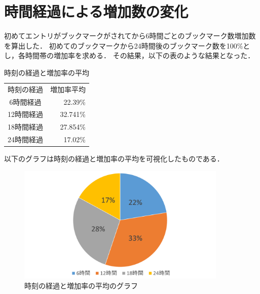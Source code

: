 \newpage
\section{時間経過による増加数の変化}
初めてエントリがブックマークがされてから6時間ごとのブックマーク数増加数を算出した．
初めてのブックマークから24時間後のブックマーク数を100\%とし，各時間帯の増加率を求める．
その結果，以下の表のような結果となった．

\begin{table}[htb]
\caption{時刻の経過と増加率の平均}\label{1t}
  \begin{tabular}{cr}
    時刻の経過 & 増加率平均 \\
    6時間経過 & 22.39\% \\
    12時間経過 & 32.741\% \\
    18時間経過 & 27.854\% \\
    24時間経過 & 17.02\% \\
  \end{tabular}
\end{table}

以下のグラフは時刻の経過と増加率の平均を可視化したものである．

\begin{figure}[htb]
\centering
\includegraphics[width=10cm]{en.pdf}
\caption{時刻の経過と増加率の平均のグラフ}\label{en}
\end{figure}

\newpage

